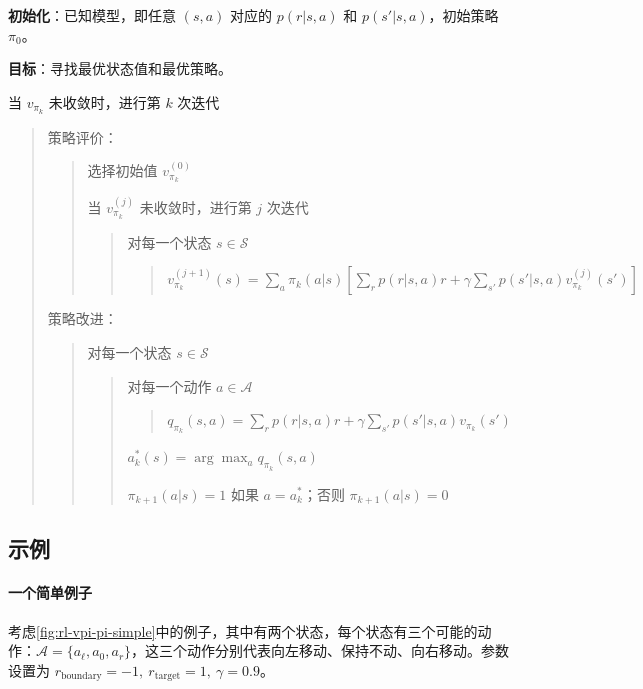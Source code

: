\begin{algo}[策略迭代算法]\label{alg:rl-pi}
\textbf{初始化}：已知模型，即任意 $(s,a)$ 对应的 $p(r|s,a)$ 和 $p(s'|s,a)$，初始策略 $\pi_{0}$。

\textbf{目标}：寻找最优状态值和最优策略。

\smallskip
\noindent 当 $v_{\pi_{k}}$ 未收敛时，进行第 $k$ 次迭代
\begin{quote}
策略评价：
\begin{quote}
选择初始值 $v_{\pi_{k}}^{(0)}$

当 $v_{\pi_{k}}^{(j)}$ 未收敛时，进行第 $j$ 次迭代
\begin{quote}
对每一个状态 $s \in \mathcal{S}$
\begin{quote}
$v_{\pi_{k}}^{(j+1)}(s) = \sum_{a} \pi_{k}(a|s) \left[\sum_{r} p(r|s,a) r + \gamma \sum_{s'} p(s'|s,a) v_{\pi_{k}}^{(j)}(s')\right]$
\end{quote}
\end{quote}
\end{quote}
策略改进：
\begin{quote}
对每一个状态 $s \in \mathcal{S}$
\begin{quote}
对每一个动作 $a \in \mathcal{A}$
\begin{quote}
$q_{\pi_{k}}(s,a) = \sum_{r} p(r|s,a) r + \gamma \sum_{s'} p(s'|s,a) v_{\pi_{k}}(s')$
\end{quote}
$a_{k}^{*}(s) = \arg\max_{a} q_{\pi_{k}}(s,a)$

$\pi_{k+1}(a|s) = 1$ 如果 $a = a_{k}^{*}$；否则 $\pi_{k+1}(a|s) = 0$
\end{quote}
\end{quote}
\end{quote}
\end{algo}

\subsection{示例}
\label{sec:rl-vpi-pi-example}

\paragraph{一个简单例子}

考虑\cref{fig:rl-vpi-pi-simple}中的例子，其中有两个状态，每个状态有三个可能的动作：$\mathcal{A} = \{a_{\ell}, a_{0}, a_{r}\}$，这三个动作分别代表向左移动、保持不动、向右移动。参数设置为 $r_{\mathrm{boundary}} = -1,\ r_{\mathrm{target}} = 1,\ \gamma = 0.9$。

